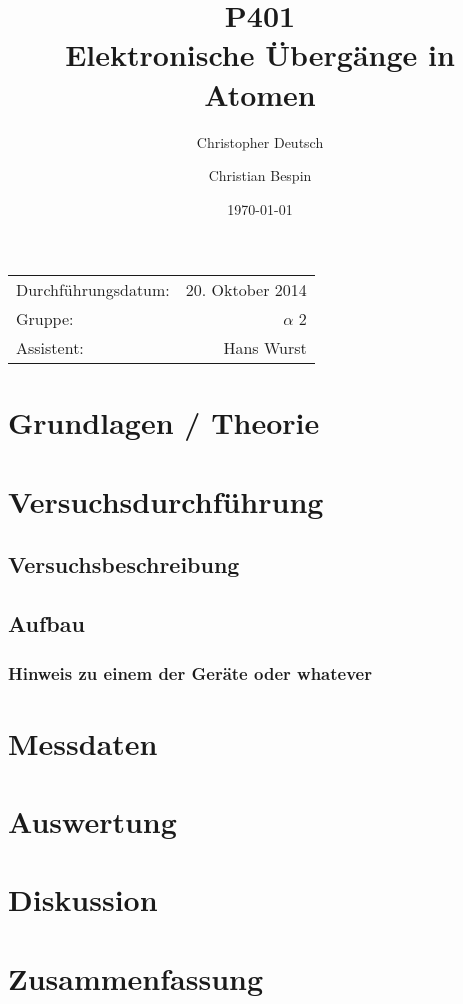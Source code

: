 \documentclass[10pt, a4paper]{article}
\title{P401 \\ Elektronische Übergänge in Atomen}
\author{Christopher Deutsch \and Christian Bespin}
\date{\today}
\begin{document}
\maketitle

\begin{center}
\begin{tabular}{l r}
Durchführungsdatum: & 20. Oktober 2014 \\
Gruppe: & $\alpha$ 2 \\
Assistent: & Hans Wurst
\end{tabular}
\end{center}


\begin{abstract}
\end{abstract}

\setcounter{tocdepth}{2} %
\tableofcontents


\newpage

\section{Grundlagen / Theorie}

\section{Versuchsdurchführung}

\subsection{Versuchsbeschreibung}

\subsection{Aufbau}

\subsubsection{Hinweis zu einem der Geräte oder whatever}

\section{Messdaten}

\section{Auswertung}

\section{Diskussion}

\section{Zusammenfassung}

\end{document}

